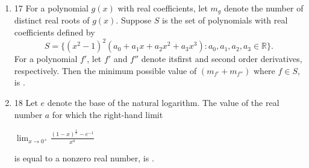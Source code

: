 \documentclass{article}
\begin{document}
\begin{enumerate}
\item 17  For a polynomial $g(x)$ with real coefficients, let $m_g$ denote the number of distinct real roots of $g(x)$. Suppose $S$ is the set of polynomials with real coefficients defined by\[S = \{(x^2 - 1)^2 (a_0 + a_1 x + a_2 x^2 + a_3 x^3) : a_0, a_1, a_2, a_3 \in \mathbb{R} \}.\]For a polynomial $f'$, let $f'$ and $f''$ denote itsfirst and second order derivatives, respectively. Then the minimum possible value of $(m_{f'} + m_{f''})$ where $f \in S$, is \underline{\hspace{2cm}}.

\item 18  Let $e$ denote the base of the natural logarithm. The value of the real number $a$ for which the right-hand limit

\begin{center}
    $\lim_{x \to 0^+} \frac{(1 - x)^{\frac{1}{x}} - e^{-1}}{x^a}$
\end{center}

    is equal to a nonzero real number, is \underline{\hspace{2cm}}.


\end{enumerate}
\end{document}
